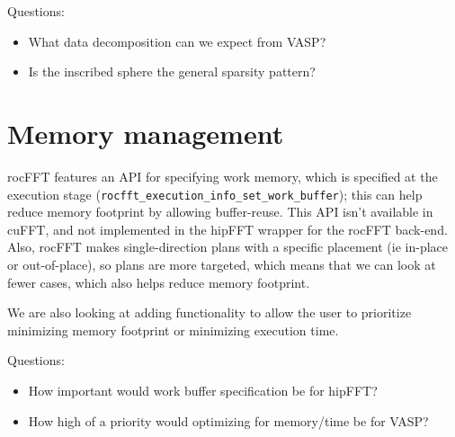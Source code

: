 \documentclass[12pt]{article}
\renewcommand{\(}{\left(}
\renewcommand{\)}{\right)}
\begin{document}
Questions:
\begin{itemize}
\item What data decomposition can we expect from VASP?
\item Is the inscribed sphere the general sparsity pattern?
\end{itemize}

\section{Memory management}

rocFFT features an API for specifying work memory, which is specified
at the execution stage
(\lstinline{rocfft_execution_info_set_work_buffer}); this can help
reduce memory footprint by allowing buffer-reuse.  This API isn't
available in cuFFT, and not implemented in the hipFFT wrapper for the
rocFFT back-end.  Also, rocFFT makes single-direction plans with a
specific placement (ie in-place or out-of-place), so plans are more
targeted, which means that we can look at fewer cases, which also
helps reduce memory footprint.

We are also looking at adding functionality to allow the user to
prioritize minimizing memory footprint or minimizing execution time.

Questions:
\begin{itemize}
\item How important would work buffer specification be for hipFFT?
\item How high of a priority would optimizing for memory/time be for VASP?
\end{itemize}
\end{document}
